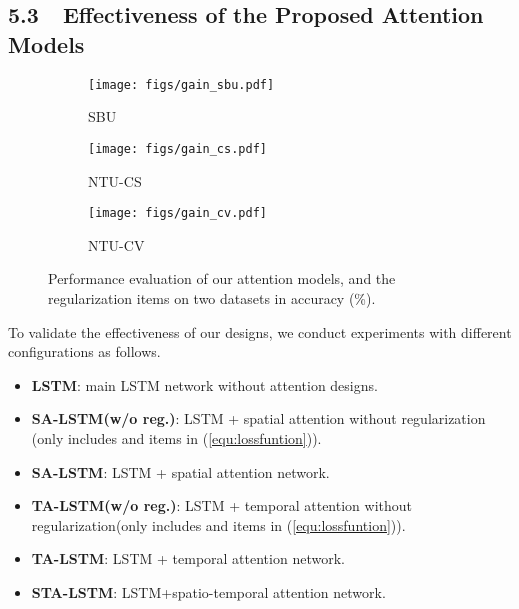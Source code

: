\documentclass[letterpaper]{article}
\begin{document}
\subsection{5.3~~Effectiveness of the Proposed Attention Models}
\begin{figure}[th]
	\vspace{-3mm}
	\centering
	\begin{subfigure}[t]{0.15\textwidth}
		\centering\texttt{[image: figs/gain\_sbu.pdf]}
		\vspace{-4mm}
		\caption{SBU}
		\label{fig:skeleton1}
		
	\end{subfigure}
	\begin{subfigure}[t]{0.15\textwidth}
		\centering\texttt{[image: figs/gain\_cs.pdf]}
\vspace{-4mm}
		\caption{NTU-CS}
		\label{fig:skeleton2}
		
	\end{subfigure}
	\begin{subfigure}[t]{0.15\textwidth}
		\centering\texttt{[image: figs/gain\_cv.pdf]}
		\vspace{-4mm}
		\caption{NTU-CV}
		\label{fig:skeleton2}
	\end{subfigure}
	\vspace{-3mm}
	\caption[]{Performance evaluation of our attention models, and the regularization items on two datasets in accuracy (\%).}\label{fig:in-comp}
\vspace{-3.5mm}	
\end{figure}
\vspace{1.8mm}
To validate the effectiveness of our designs, we conduct experiments with different configurations as follows.
\vspace{-1mm}
\begin{itemize}
\setlength{\itemsep}{0pt}
\setlength{\parskip}{0pt}
	\item \textbf{LSTM}: main LSTM network without attention designs.
	\item \textbf{SA-LSTM(w/o reg.)}: LSTM  + spatial attention without regularization (only includes  and  items in (\ref{equ:lossfuntion})).
	\item \textbf{SA-LSTM}: LSTM  + spatial attention network.
	\item \textbf{TA-LSTM(w/o reg.)}: LSTM + temporal attention without regularization(only includes  and  items in (\ref{equ:lossfuntion})).
	\item \textbf{TA-LSTM}: LSTM + temporal attention network.
	\item \textbf{STA-LSTM}: LSTM+spatio-temporal attention network.
\end{itemize}
\end{document}
